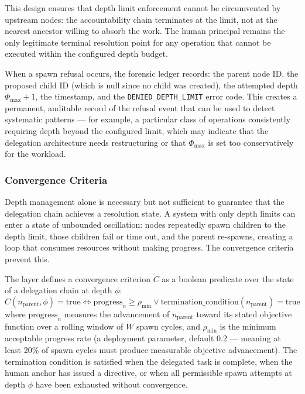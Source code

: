This design ensures that depth limit enforcement cannot be circumvented by upstream nodes: the accountability chain terminates at the limit, not at the nearest ancestor willing to absorb the work. The human principal remains the only legitimate terminal resolution point for any operation that cannot be executed within the configured depth budget.

When a spawn refusal occurs, the forensic ledger records: the parent node ID, the proposed child ID (which is null since no child was created), the attempted depth $\Phi_{\max} + 1$, the timestamp, and the \texttt{DENIED\_DEPTH\_LIMIT} error code. This creates a permanent, auditable record of the refusal event that can be used to detect systematic patterns — for example, a particular class of operations consistently requiring depth beyond the configured limit, which may indicate that the delegation architecture needs restructuring or that $\Phi_{\max}$ is set too conservatively for the workload.

\subsubsection{Convergence Criteria}\label{sec:convergence-criteria}

Depth management alone is necessary but not sufficient to guarantee that the delegation chain achieves a resolution state. A system with only depth limits can enter a state of unbounded oscillation: nodes repeatedly spawn children to the depth limit, those children fail or time out, and the parent re-spawns, creating a loop that consumes resources without making progress. The convergence criteria prevent this.

The \bounds{} layer defines a convergence criterion $C$ as a boolean predicate over the state of a delegation chain at depth $\phi$:
\begin{equation}
C(n_{\text{parent}}, \phi) = \text{true} \iff \text{progress}_n \geq \rho_{\text{min}} \lor \text{termination\_condition}(n_{\text{parent}}) = \text{true}
\end{equation}
where $\text{progress}_n$ measures the advancement of $n_{\text{parent}}$ toward its stated objective function over a rolling window of $W$ spawn cycles, and $\rho_{\text{min}}$ is the minimum acceptable progress rate (a deployment parameter, default 0.2 — meaning at least 20\% of spawn cycles must produce measurable objective advancement). The termination condition is satisfied when the delegated task is complete, when the human anchor has issued a directive, or when all permissible spawn attempts at depth $\phi$ have been exhausted without convergence.

